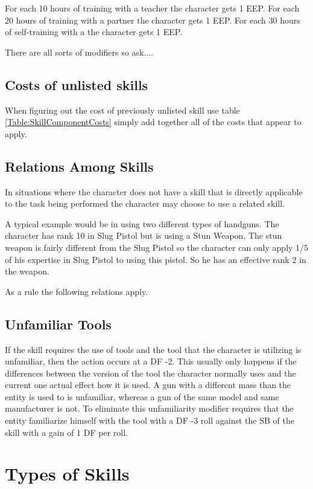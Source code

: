 For each 10 hours of training with a teacher the character gets 1 EEP.
For each 20 hours of training with a partner the character gets 1 EEP.
For each 30 hours of self-training with a the character gets 1 EEP.

There are all sorts of modifiers so ask....

\subsection{Costs of unlisted skills}

When figuring out the cost of previously unlisted skill use table \ref{Table:SkillComponentCosts}
simply add together all of the  costs that appear to apply.

\subsection{Relations Among Skills}

In situations where the character does not have a skill that
is directly applicable to the task being performed the character 
may choose to use a related skill.

A typical example would be in using two different types of handguns. The
character has rank 10 in Slug Pistol but is using a Stun Weapon. The stun
weapon is fairly different from the Slug Pistol so the character can only
apply 1/5 of his expertise in Slug Pistol to using this pistol. So he has
an effective rank 2 in the weapon.

As a rule the following relations apply.



\subsection{Unfamiliar Tools}

If the skill requires the use of tools and the tool that the character is
utilizing is unfamiliar, then the action occurs at a DF -2. This usually
only happens if the differences between the version of the tool the
character normally uses and the current one actual effect how it is
used. A gun with a different mass than the entity is used to is
unfamiliar, whereas a gun of the same model and same manufacturer is
not. To eliminate this unfamiliarity modifier requires that the entity
familiarize himself with the tool with a DF -3 roll against the SB of 
the skill with a gain of 1 DF per roll. 

\section{Types of Skills}

